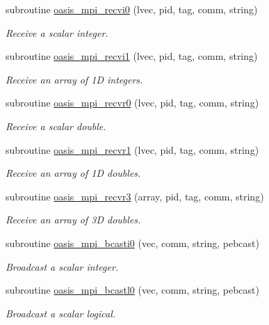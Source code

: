 \begin{DoxyCompactItemize}
subroutine \hyperlink{namespacemod__oasis__mpi_ad89796f10a2225d4930cdec65546cf98}{oasis\+\_\+mpi\+\_\+recvi0} (lvec, pid, tag, comm, string)
\begin{DoxyCompactList}\small\item\em Receive a scalar integer. \end{DoxyCompactList}\item 
subroutine \hyperlink{namespacemod__oasis__mpi_acf13ea626ed09fe98123f23d0990879d}{oasis\+\_\+mpi\+\_\+recvi1} (lvec, pid, tag, comm, string)
\begin{DoxyCompactList}\small\item\em Receive an array of 1D integers. \end{DoxyCompactList}\item 
subroutine \hyperlink{namespacemod__oasis__mpi_a2578d560c80d608340b5a49b327642ba}{oasis\+\_\+mpi\+\_\+recvr0} (lvec, pid, tag, comm, string)
\begin{DoxyCompactList}\small\item\em Receive a scalar double. \end{DoxyCompactList}\item 
subroutine \hyperlink{namespacemod__oasis__mpi_a2bbd8de453167b4c73aa09c3c44c0ca8}{oasis\+\_\+mpi\+\_\+recvr1} (lvec, pid, tag, comm, string)
\begin{DoxyCompactList}\small\item\em Receive an array of 1D doubles. \end{DoxyCompactList}\item 
subroutine \hyperlink{namespacemod__oasis__mpi_a2c3b82d2346a69cd20be3d35c5e70be6}{oasis\+\_\+mpi\+\_\+recvr3} (array, pid, tag, comm, string)
\begin{DoxyCompactList}\small\item\em Receive an array of 3D doubles. \end{DoxyCompactList}\item 
subroutine \hyperlink{namespacemod__oasis__mpi_af8bc029a22d59f1188b7f8a1a2645c40}{oasis\+\_\+mpi\+\_\+bcasti0} (vec, comm, string, pebcast)
\begin{DoxyCompactList}\small\item\em Broadcast a scalar integer. \end{DoxyCompactList}\item 
subroutine \hyperlink{namespacemod__oasis__mpi_a1426590a36b24f1770381b9c35563cff}{oasis\+\_\+mpi\+\_\+bcastl0} (vec, comm, string, pebcast)
\begin{DoxyCompactList}\small\item\em Broadcast a scalar logical. \end{DoxyCompactList}\item 

\end{DoxyCompactItemize}
